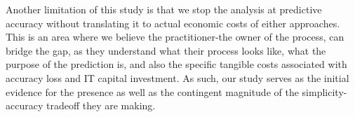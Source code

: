 \documentclass[
]{ceurart}
\begin{document}
Another limitation of this study is that we stop the analysis at predictive accuracy without translating it to actual economic costs of either approaches. This is an area where we believe the practitioner-the owner of the process, can bridge the gap, as they
understand what their process looks like, what the purpose of the prediction is, and also the specific tangible costs associated with accuracy loss and IT capital investment. As such, our study serves as the initial evidence for the presence as well as the contingent magnitude of the simplicity-accuracy tradeoff they are making.





\end{document}
